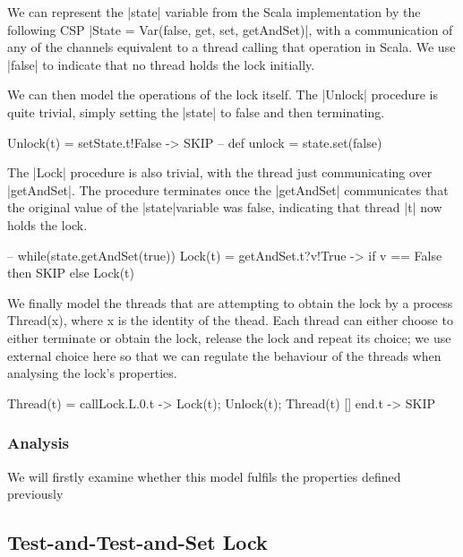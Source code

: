 We can represent the |state| variable from the Scala implementation by the following CSP |State = Var(false, get, set, getAndSet)|, with a communication of any of the channels equivalent to a thread calling that operation in Scala. We use |false| to indicate that no thread holds the lock initially.

We can then model the operations of the lock itself. The |Unlock| procedure is quite trivial, simply setting the |state| to false and then terminating.

\begin{cspm}
  Unlock(t) = setState.t!False -> SKIP -- def unlock = state.set(false)
\end{cspm}

The |Lock| procedure is also trivial, with the thread just communicating over |getAndSet|. The procedure terminates once the |getAndSet| communicates that the original value of the |state|variable was false, indicating that thread |t| now holds the lock.

\begin{cspm}
  -- while(state.getAndSet(true)){ }
  Lock(t) = getAndSet.t?v!True -> if v == False then SKIP 
                                    else Lock(t)
\end{cspm}

We finally model the threads that are attempting to obtain the lock by a process Thread(x), where x is the identity of the thead. Each thread can either choose to either terminate or obtain the lock, release the lock and repeat its choice; we use external choice here so that we can regulate the  behaviour of the threads when analysing the lock's properties.

\begin{cspm}
  Thread(t) = callLock.L.0.t -> Lock(t); Unlock(t); Thread(t)
              [] end.t -> SKIP
\end{cspm}

\subsubsection{Analysis}

We will firstly examine whether this model fulfils the properties defined previously



\subsection{Test-and-Test-and-Set Lock}

